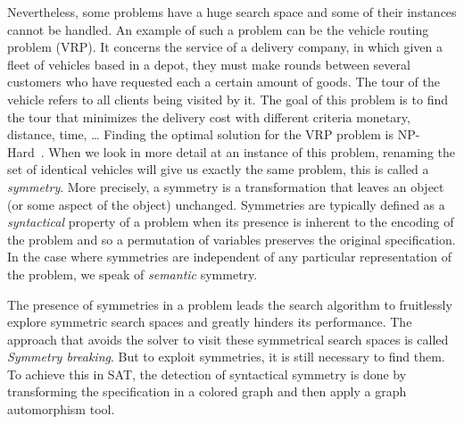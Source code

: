 Nevertheless, some problems have a huge search space and some of their instances cannot be handled.
An example of such a problem can be the vehicle routing problem (VRP).
It concerns the service of a delivery company, in which
given a fleet of vehicles based in a depot, they must make rounds between several customers  who have requested
each a certain amount of goods. The tour of the vehicle refers to all clients being visited by it. 
The goal of this problem is to find the tour that minimizes the delivery cost with different criteria monetary, distance, time, …
Finding the optimal solution for the VRP problem is NP-Hard~\cite{toth2002vehicle}.
When we look in more detail at an instance of this problem, renaming the set of identical vehicles will give us exactly the same problem,
this is called a \textit{symmetry}. More precisely, a symmetry is a transformation that leaves an object (or some aspect of the object) unchanged. Symmetries are typically defined as a \textit{syntactical} property of a problem when its presence is inherent to the encoding of the problem and so a permutation of variables preserves the original specification. In the case where symmetries are independent of any 
particular representation of the problem, we speak of \textit{semantic} symmetry.

The presence of symmetries in a problem leads the search algorithm to fruitlessly explore symmetric
search spaces and greatly hinders its performance.
 The approach that avoids the solver to visit these symmetrical search spaces is called \textit{Symmetry breaking}.
But to exploit symmetries, it is still necessary to find them.
To achieve this in SAT, the detection of syntactical symmetry is done by transforming the specification
in a colored graph and then apply a graph automorphism tool.


%
%
%
%
%
%
%
%
%

